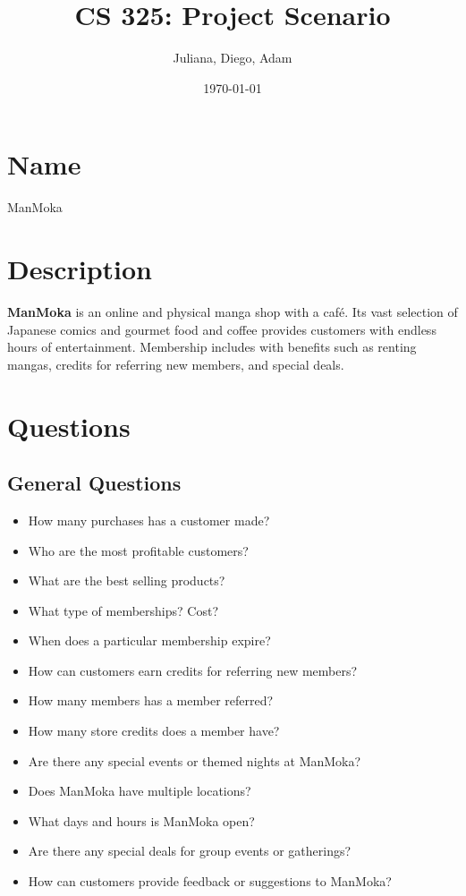 \documentclass{article}
\title{CS 325: Project Scenario}
\author{Juliana, Diego, Adam}
\date{\today}
\begin{document}
\maketitle

\section*{Name}
\begin{center}
        \Huge{ManMoka}
\end{center}

\section*{Description}
\textbf{ManMoka} is an online and physical manga shop with a café. Its vast selection of Japanese comics and gourmet food and coffee provides customers with endless hours of entertainment. Membership includes with benefits such as renting mangas, credits for referring new members, and special deals.



\section*{Questions}

\subsection*{General Questions}
\begin{itemize}
\item How many purchases has a customer made?
\item Who are the most profitable customers?
\item What are the best selling products?
\item What type of memberships? Cost?
\item When does a particular membership expire?
\item How can customers earn credits for referring new members?
\item How many members has a member referred?
\item How many store credits does a member have?
\item Are there any special events or themed nights at ManMoka?
\item Does ManMoka have multiple locations?
\item What days and hours is ManMoka open?
\item Are there any special deals for group events or gatherings?
\item How can customers provide feedback or suggestions to ManMoka?
\end{itemize}
\end{document}

